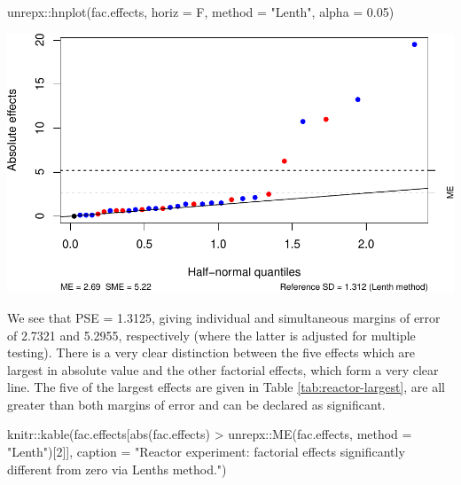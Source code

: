 \documentclass[
]{book}
\newenvironment{Shaded}{\begin{snugshade}}{\end{snugshade}}
\newcommand{\AttributeTok}[1]{\textcolor[rgb]{0.77,0.63,0.00}{#1}}
\newcommand{\DecValTok}[1]{\textcolor[rgb]{0.00,0.00,0.81}{#1}}
\newcommand{\FloatTok}[1]{\textcolor[rgb]{0.00,0.00,0.81}{#1}}
\newcommand{\FunctionTok}[1]{\textcolor[rgb]{0.00,0.00,0.00}{#1}}
\newcommand{\NormalTok}[1]{#1}
\newcommand{\SpecialCharTok}[1]{\textcolor[rgb]{0.00,0.00,0.00}{#1}}
\newcommand{\StringTok}[1]{\textcolor[rgb]{0.31,0.60,0.02}{#1}}
\theoremstyle{definition}
\theoremstyle{definition}
\theoremstyle{definition}
\theoremstyle{definition}
\theoremstyle{remark}
\begin{document}
\begin{Shaded}
\begin{Highlighting}[]
\NormalTok{unrepx}\SpecialCharTok{::}\FunctionTok{hnplot}\NormalTok{(fac.effects, }\AttributeTok{horiz =}\NormalTok{ F, }\AttributeTok{method =} \StringTok{"Lenth"}\NormalTok{, }\AttributeTok{alpha =} \FloatTok{0.05}\NormalTok{)}
\end{Highlighting}
\end{Shaded}

\includegraphics{bookdown_math3014-6027_files/figure-latex/reactor-lenth-1.pdf}

We see that PSE = 1.3125, giving individual and simultaneous margins of error of 2.7321 and 5.2955, respectively (where the latter is adjusted for multiple testing). There is a very clear distinction between the five effects which are largest in absolute value and the other factorial effects, which form a very clear line. The five of the largest effects are given in Table \ref{tab:reactor-largest}, are all greater than both margins of error and can be declared as significant.

\begin{Shaded}
\begin{Highlighting}[]
\NormalTok{knitr}\SpecialCharTok{::}\FunctionTok{kable}\NormalTok{(fac.effects[}\FunctionTok{abs}\NormalTok{(fac.effects) }\SpecialCharTok{\textgreater{}}\NormalTok{ unrepx}\SpecialCharTok{::}\FunctionTok{ME}\NormalTok{(fac.effects, }
                                                       \AttributeTok{method =} \StringTok{"Lenth"}\NormalTok{)[}\DecValTok{2}\NormalTok{]],}
             \AttributeTok{caption =} \StringTok{"Reactor experiment: factorial effects significantly different from zero via Lenth\textquotesingle{}s method."}\NormalTok{)}
\end{Highlighting}
\end{Shaded}
\end{document}
